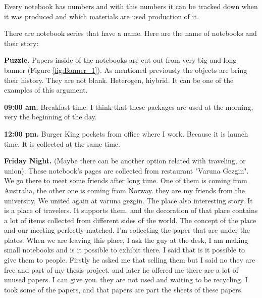 Every notebook has numbers and with this numbers it can be tracked down when it was produced and which materials are used production of it.

There are notebook series that have a name. Here are the name of notebooks and their story:

\textbf{Puzzle.} Papers inside of the notebooks are cut out from very big and long banner (Figure \ref{fig:Banner_1}). As mentioned previously the objects are bring their history. They are not blank. Heterogen, hiybrid. It can be one of the examples of this argument.

\textbf{09:00 am.} Breakfast time. I think that these packages are used at the morning, very the beginning of the day.

\textbf{12:00 pm.} Burger King pockets from office where I work. Because it is launch time. It is collected at the same time.

\textbf{Friday Night.} (Maybe there can be another option related with traveling, or union). These notebook's pages are collected from restaurant "Varuna Gezgin". We go there to meet some friends after long time. One of them is coming from Australia, the other one is coming from Norway. they are my friends from the university. We united again at varuna gezgin. The place also interesting story. It is a place of travelers. It supports them. and the decoration of that place contains a lot of items collected from different sides of the world. The concept of the place and our meeting perfectly matched. I'm collecting the paper that are under the plates. When we are leaving this place, I ask the guy at the desk, I am making small notebooks and is it possible to exhibit there. I said that is it possible to give them to people. Firstly he asked me that selling them but I said no they are free and part of my thesis project. and later he offered me there are a lot of unused papers. I can give you. they are not used and waiting to be recycling. I took some of the papers, and that papers are part the sheets of these papers.



